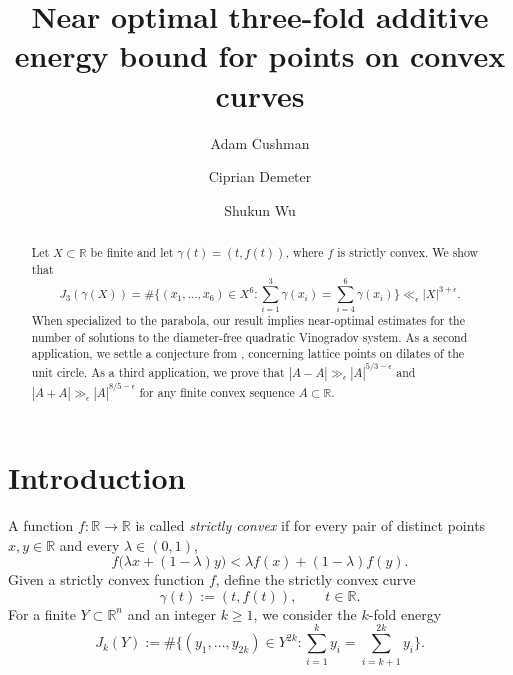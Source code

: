 \documentclass{amsart}
\numberwithin{equation}{section}
\newcommand{\e}{\epsilon}
\newcommand{\ZR}{\mathbb{R}}
\newcommand{\R}{\mathbb{R}}
\begin{document}
\title[Three-fold additive energy bound for points on convex curves]{Near optimal three-fold additive energy bound for points on convex curves}

\author{Adam Cushman} \address{ Adam Cushman\\  Department of Mathematics\\ Indiana University Bloomington, USA} 


\author{Ciprian Demeter} \address{ Ciprian Demeter\\  Department of Mathematics\\ Indiana University Bloomington, USA} 


\author{Shukun Wu} \address{ Shukun Wu\\  Department of Mathematics\\ Indiana University Bloomington, USA} 


\begin{abstract}
Let $X\subset\R$ be finite and let $\gamma(t)=(t,f(t))$, where $f$ is strictly convex. 
We show that
\[
    J_3(\gamma(X))
    =\#\{(x_1,\ldots,x_6)\in X^6:\sum_{i=1}^3\gamma(x_i)=\sum_{i=4}^6\gamma(x_i)\}
    \ll_{\epsilon}|X|^{3+\epsilon}.
\]
When specialized to the parabola, our result implies near-optimal estimates for the number of solutions to the diameter-free quadratic Vinogradov system.
As a second application, we settle a conjecture from  \cite{Krishnapur-Kurlberg-Wigman}, \cite{Bombieri-Bourgain} concerning lattice points on dilates of the unit circle. 
As a third application, we
prove that $|A-A|\gg_\e|A|^{5/3-\e}$ and $|A+A|\gg_\e|A|^{8/5-\e}$ for any finite convex sequence $A\subset \R$. 

\end{abstract}

\maketitle


\section{Introduction}

A function $f:\ZR\to\ZR$ is called \emph{strictly convex} if for every pair of
distinct points $x,y\in \ZR$ and every $\lambda\in(0,1)$,
\[
f\bigl(\lambda x+(1-\lambda)y\bigr)<
\lambda f(x)+(1-\lambda)f(y).
\]
Given a strictly convex function $f$, define the strictly convex curve
\[
   \gamma(t):=(t,f(t)), \qquad t\in\ZR.
\]
For a finite $Y\subset \ZR^n$ and an integer $k\ge 1$, we consider the $k$-fold energy
\begin{equation}
\label{J-k}
    J_k(Y)
    :=\#\{(y_1,\ldots,y_{2k})\in Y^{2k}:\sum_{i=1}^{k}y_i=\sum_{i=k+1}^{2k}y_i\}.
\end{equation}
\end{document}
